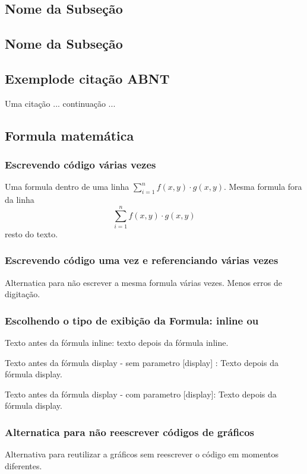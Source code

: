 \subsection{Nome da Subseção}

\lipsum[1-4]

\subsection{Nome da Subseção}
\lipsum[1-4]

\subsection{Exemplode citação ABNT}

Uma citação ... \cite{enome2023titulo}  continuação ...

\subsection{Formula matemática}

\subsubsection{Escrevendo código várias vezes}
Uma formula dentro de uma linha $ \sum_{i=1}^{n} f(x,y) \cdot g(x,y) $.
Mesma formula fora da linha $$ \sum_{i=1}^{n} f(x,y) \cdot g(x,y) $$
resto do texto.

\subsubsection{Escrevendo código uma vez e referenciando várias vezes}
Alternatica para não escrever a mesma formula várias vezes. Menos erros de digitação.
\formula

\subsubsection{Escolhendo o tipo de exibição da Formula: inline ou}

 Texto antes da fórmula inline: \formulaz[inline] texto depois da fórmula inline.

 Texto antes da fórmula display - sem parametro [display] : 
 \formulaz
 Texto depois da fórmula display.

 Texto antes da fórmula display - com parametro [display]: 
 \formulaz[display]
 Texto depois da fórmula display.
 

 \subsubsection{Alternatica para não reescrever códigos de gráficos}
Alternativa para reutilizar a gráficos sem reescrever o código em momentos diferentes.

\nomeGraficoxx